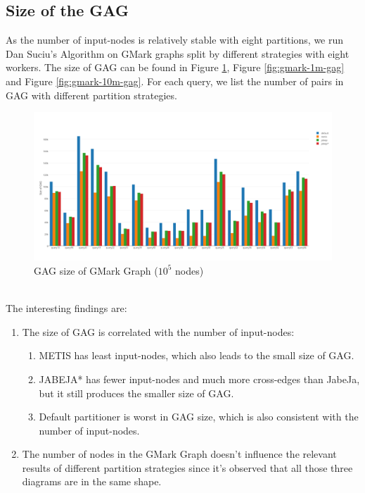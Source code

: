 \subsection{Size of the GAG}
As the number of input-nodes is relatively stable with eight partitions, we run Dan Suciu's Algorithm on GMark graphs split by different strategies with eight workers. The size of GAG can be found in Figure \ref{fig:gmark-01m-gag}, Figure \ref{fig:gmark-1m-gag} and Figure \ref{fig:gmark-10m-gag}. For each query, we list the number of pairs in GAG with different partition strategies.
\begin{figure}[h!]
  \caption{GAG size of GMark Graph ($10^5$ nodes)}
  \label{fig:gmark-01m-gag}
  \centering
    \includegraphics[width=1.0\textwidth]{img/gmark-01m-gag}
\end{figure}
\\The interesting findings are:
\begin{enumerate}
    \item The size of GAG is correlated with the number of input-nodes:
    \begin{enumerate}
        \item METIS has least input-nodes, which also leads to the small size of GAG.
        \item JABEJA* has fewer input-nodes and much more cross-edges than JabeJa, but it still produces the smaller size of GAG.
        \item Default partitioner is worst in GAG size, which is also consistent with the number of input-nodes.
    \end{enumerate} 
    \item The number of nodes in the GMark Graph doesn't influence the relevant results of different partition strategies since it's observed that all those three diagrams are in the same shape.
\end{enumerate}
